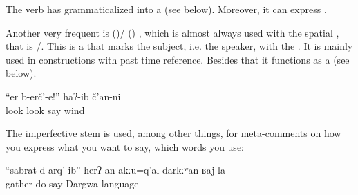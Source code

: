 The verb  has grammaticalized into a   (see below). Moreover, it can express .

Another very frequent  is  ()\slash{} () , which is almost always used with the spatial   , that is \slash{}. This is a  that marks the subject, i.e. the speaker, with the . It is mainly used in  constructions with past time reference. Besides that it functions as a   (see below).
%
\begin{exe}
	\ex	\label{ex:‎‎Look!, said the wind}
	\gll	``er	b-erč'-e!''	haʔ-ib	č'an-ni\\
		look	look	say	wind\\
	\glt	{}
\end{exe}

The imperfective stem is used, among other things, for meta-comments on how you express what you want to say, which words you use:
%
\begin{exe}
	\ex	\label{ex:Gather did, you should not say in Dargwa}
	\gll	``sabrat		d-arq'-ib''	herʔ-an	akːu=q'al	darkːʷan	ʁaj-la	\\
		gather	do	say		Dargwa	language\\
	\glt	{}
\end{exe}

